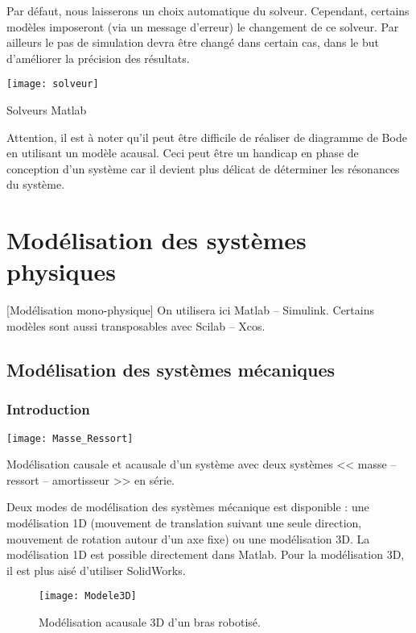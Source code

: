 Par défaut, nous laisserons un choix automatique du solveur. Cependant, certains modèles imposeront (via un message d'erreur) le changement de ce solveur. Par ailleurs le pas de simulation devra être changé dans certain cas, dans le but d'améliorer la précision des résultats.

\begin{marginfigure}[-2cm]
\texttt{[image: solveur]}
\caption{Solveurs Matlab}
\end{marginfigure}


\begin{warn}
Attention, il est à noter qu'il peut être difficile de réaliser de diagramme de Bode en utilisant un modèle acausal. Ceci peut être un handicap en phase de conception d'un système car il devient plus délicat de déterminer les résonances du système.
\end{warn}
\section{Modélisation des systèmes physiques}[Modélisation mono-physique]
On utilisera ici Matlab -- Simulink. Certains modèles sont aussi transposables avec Scilab -- Xcos. 

\subsection{Modélisation des systèmes mécaniques}
\subsubsection{Introduction}

\begin{marginfigure}[-1.5cm]
\texttt{[image: Masse\_Ressort]}

\caption{Modélisation causale et acausale d'un système avec deux systèmes << masse -- ressort -- amortisseur >> en série.}
\end{marginfigure}

Deux modes de modélisation des systèmes mécanique est disponible : une modélisation 1D (mouvement de translation suivant une seule direction, mouvement de rotation autour d'un axe fixe) ou une modélisation 3D. 
La modélisation 1D est possible directement dans Matlab. Pour la modélisation 3D, il est plus aisé d'utiliser SolidWorks. 


\begin{figure}[!h]
\texttt{[image: Modele3D]}

\caption{Modélisation acausale 3D d'un bras robotisé.}
\end{figure}

